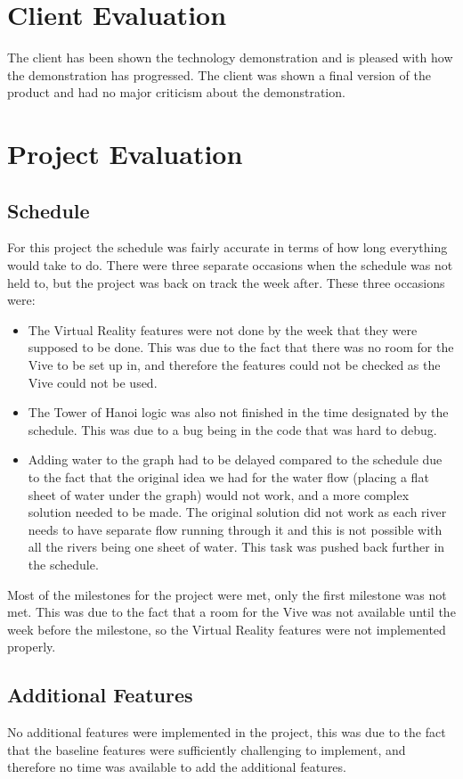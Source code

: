 \section{Client Evaluation}
	The client has been shown the technology demonstration and is pleased with how the demonstration has progressed. The client was shown a final version of the product and had no major criticism about the demonstration.

\section{Project Evaluation}
\subsection{Schedule}
	For this project the schedule was fairly accurate in terms of how long everything would take to do. There were three separate occasions when the schedule was not held to, but the project was back on track the week after. These three occasions were:
	\begin{itemize}
		\item The Virtual Reality features were not done by the week that they were supposed to be done. This was due to the fact that there was no room for the Vive to be set up in, and therefore the features could not be checked as the Vive could not be used.
		\item The Tower of Hanoi logic was also not finished in the time designated by the schedule. This was due to a bug being in the code that was hard to debug.
		\item Adding water to the graph had to be delayed compared to the schedule due to the fact that the original idea we had for the water flow (placing a flat sheet of water under the graph) would not work, and a more complex solution needed to be made. The original solution did not work as each river needs to have separate flow running through it and this is not possible with all the rivers being one sheet of water. This task was pushed back further in the schedule.
	\end{itemize}

	Most of the milestones for the project were met, only the first milestone was not met. This was due to the fact that a room for the Vive was not available until the week before the milestone, so the Virtual Reality features were not implemented properly.

\subsection{Additional Features}
	No additional features were implemented in the project, this was due to the fact that the baseline features were sufficiently challenging to implement, and therefore no time was available to add the additional features.

